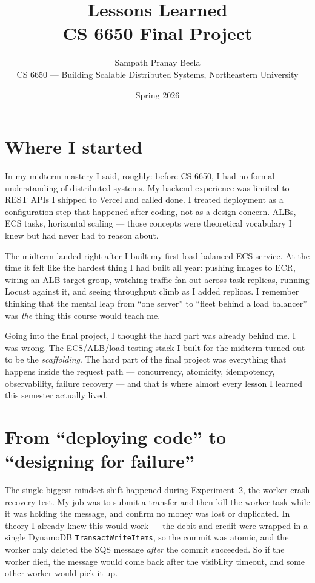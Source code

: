 \documentclass[11pt,a4paper]{article}
\title{\vspace{-1.5em}\textbf{\color{accentblue}Lessons Learned} \\ \large CS 6650 Final Project \vspace{-0.3em}}
\author{Sampath Pranay Beela \\ \small CS 6650 --- Building Scalable Distributed Systems, Northeastern University}
\date{\vspace{-0.5em}\small Spring 2026}
\begin{document}
\maketitle
\thispagestyle{fancy}
\vspace{-2em}

\section*{Where I started}

\begin{openingbox}
In my midterm mastery I said, roughly: before CS 6650, I had no formal understanding of distributed systems. My backend experience was limited to REST APIs I shipped to Vercel and called done. I treated deployment as a configuration step that happened after coding, not as a design concern.  ALBs, ECS tasks, horizontal scaling --- those concepts were theoretical vocabulary I knew but had never had to reason about.
\end{openingbox}

The midterm landed right after I built my first load-balanced ECS service. At the time it felt like the hardest thing I had built all year: pushing images to ECR, wiring an ALB target group, watching traffic fan out across task replicas, running Locust against it, and seeing throughput climb as I added replicas. I remember thinking that the mental leap from ``one server'' to ``fleet behind a load balancer'' was \textit{the} thing this course would teach me.

Going into the final project, I thought the hard part was already behind me. I was wrong. The ECS/ALB/load-testing stack I built for the midterm turned out to be the \textit{scaffolding}. The hard part of the final project was everything that happens inside the request path --- concurrency, atomicity, idempotency, observability, failure recovery --- and that is where almost every lesson I learned this semester actually lived.

\section{From ``deploying code'' to ``designing for failure''}

The single biggest mindset shift happened during Experiment~2, the worker crash recovery test. My job was to submit a transfer and then kill the worker task while it was holding the message, and confirm no money was lost or duplicated. In theory I already knew this would work --- the debit and credit were wrapped in a single DynamoDB \texttt{TransactWriteItems}, so the commit was atomic, and the worker only deleted the SQS message \textit{after} the commit succeeded. So if the worker died, the message would come back after the visibility timeout, and some other worker would pick it up.
\end{document}
